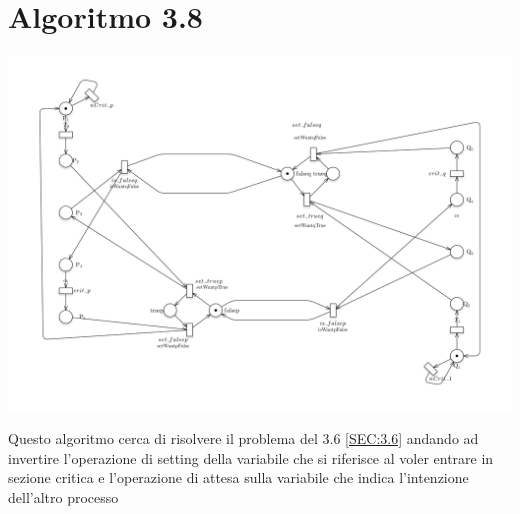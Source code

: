 \documentclass[a4paper]{article}
\begin{document}
\newpage
\section{Algoritmo 3.8}
\label{SEC:3.8}
\begin{center}\includegraphics[width=1\textwidth]{3.8.png}\end{center}
Questo algoritmo cerca di risolvere il problema del 3.6 \ref{SEC:3.6} andando ad invertire l'operazione di setting della variabile che si riferisce al voler entrare in sezione critica e l'operazione di attesa sulla variabile che indica l'intenzione dell'altro processo
\end{document}
